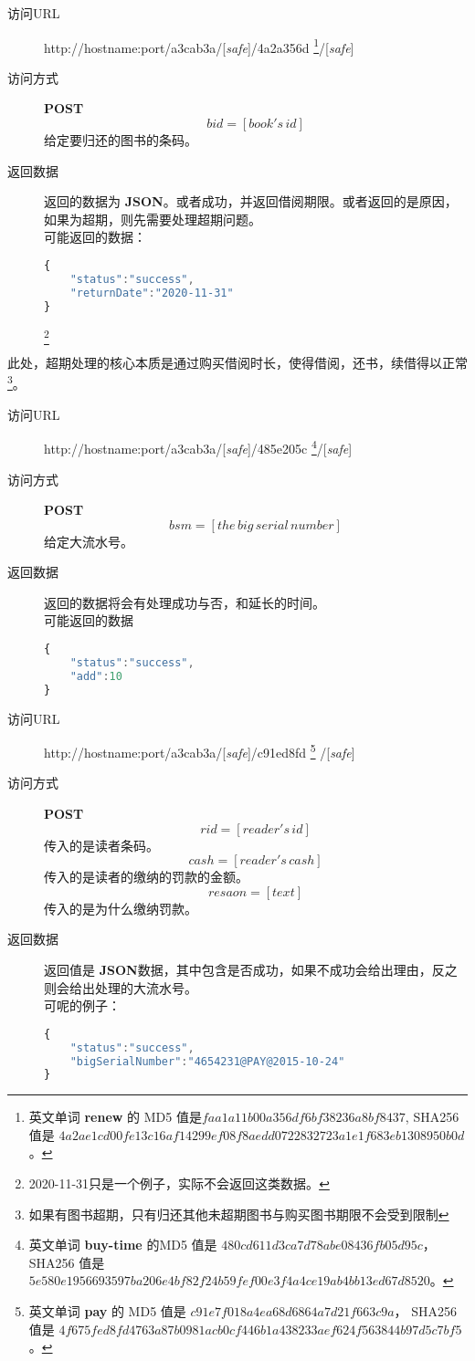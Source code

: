 \documentclass[UTF8]{article}
\def\safe{/[\textit{safe}]}
\def\POST{\colorbox[rgb]{0.77,0.53,0.97}{\textbf{POST}}}
\def\bfJSON{\textbf{JSON}\space}
\def\viaurl{\item[{\quad\colorbox[rgb]{0.47,0.88,0.89}{访问URL}}]}
\def\viareq#1{\item[{\quad\colorbox[rgb]{0.57,0.88,0.99}{访问方式}}] #1}
\def\rtdata{\item[{\quad\colorbox[rgb]{0.70,0.9,0.59}{返回数据}}]}
\begin{document}
        \begin{description}
	        \viaurl http://hostname:port/a3cab3a\safe/4a2a356d
		     \footnote{
		     	英文单词 \textbf{renew} 的
		     	MD5 值是$faa1a11b00a356df6bf38236a8bf8437$,
		     	SHA256 值是 $4a2ae1cd00fe13c16af14299ef08f8aedd0722832723a1e1f683eb1308950b0d$。
		     }\safe
		     \viareq{\POST}
		     $$bid=[book's\,id]$$
		     给定要归还的图书的条码。
		     \rtdata 返回的数据为 \bfJSON 。或者成功，并返回借阅期限。或者返回的是原因，如果为超期，则先需要处理超期问题。
		     \\ 可能返回的数据：
		     \begin{lstlisting}[language=JavaScript]
{
	"status":"success",
    "returnDate":"2020-11-31"
}
		     \end{lstlisting}
\footnote{2020-11-31只是一个例子，实际不会返回这类数据。}
		      \end{description}
        此处，超期处理的核心本质是通过购买借阅时长，使得借阅，还书，续借得以正常
        \footnote{如果有图书超期，只有归还其他未超期图书与购买图书期限不会受到限制}。
        \begin{description}
            \viaurl http://hostname:port/a3cab3a\safe/485e205c
            \footnote{
               英文单词 \textbf{buy-time} 的MD5 值是
                $480cd611d3ca7d78abe08436fb05d95c$，
                SHA256 值是
                $5e580e1956693597ba206e4bf82f24b59fef00e3f4a4ce19ab4bb13ed67d8520$。
            }\safe
            \viareq{\POST}
            $$bsm=[the\,big\,serial\,number ]$$
            给定大流水号。
            \rtdata 返回的数据将会有处理成功与否，和延长的时间。
            \\ 可能返回的数据
            \begin{lstlisting}[language=JavaScript]
{
    "status":"success",
    "add":10
}
            \end{lstlisting}
        \end{description}
        \begin{description}
	        \viaurl http://hostname:port/a3cab3a\safe/c91ed8fd
	        \footnote{英文单词 \textbf{pay} 的
	        	MD5 值是 $c91e7f018a4ea68d6864a7d21f663c9a$，
	        	SHA256 值是 $4f675fed8fd4763a87b0981acb0cf446b1a438233aef624f563844b97d5c7bf5$。
	        	}
	        \safe
	        \viareq{\POST}
	        $$rid=[reader's\,id]$$
	        传入的是读者条码。
	        $$cash=[reader's\,cash]$$
	        传入的是读者的缴纳的罚款的金额。
	        $$resaon=[text]$$
	        传入的是为什么缴纳罚款。
	        \rtdata 返回值是 \bfJSON 数据，其中包含是否成功，如果不成功会给出理由，反之则会给出处理的大流水号。
	        \\ 可呢的例子：
	        \begin{lstlisting}[language=JavaScript]
{
	"status":"success",
	"bigSerialNumber":"4654231@PAY@2015-10-24"
}
	        \end{lstlisting}
	    \end{description}
\end{document}
